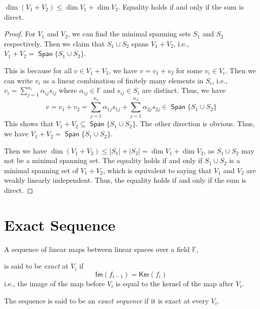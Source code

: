 \documentclass[
	11pt, %
	fleqn, %
	a4paper, %
]{LegrandOrangeBook}
\renewcommand{\ker}[1]{\mathsf{Ker}(#1)} %
\renewcommand{\Im}[1]{\mathsf{Im}(#1)} %
\newcommand{\F}{\mathbb{F}} %
\DeclareMathOperator{\Span}{\mathsf{Span}}
\begin{document}
\begin{proposition} \label{prop:dimension_of_sum_of_subspaces}
    $\dim{(V_1 + V_2)} \leq \dim{V_1} + \dim{V_2}$. Equality holds if and only if the sum is direct.
\end{proposition}

\begin{proof}
    For $V_1$ and $V_2$, we can find the minimal spanning sets $S_1$ and $S_2$ respectively. Then we claim that $S_1 \cup S_2$ spans $V_1 + V_2$, i.e., $V_1 + V_2 = \Span\{S_1 \cup S_2\}$. 
    
    This is because for all $v \in V_1 + V_2$, we have $v = v_1 + v_2$ for some $v_i \in V_i$. Then we can write $v_i$ as a linear combination of finitely many elements in $S_i$, i.e., $v_i = \sum_{j=1}^{n_i} \alpha_{ij} s_{ij}$ where $\alpha_{ij} \in \F$ and $s_{ij} \in S_i$ are distinct. Thus, we have 
    \[
        v = v_1 + v_2 = \sum_{j=1}^{n_1} \alpha_{1j} s_{1j} + \sum_{j=1}^{n_2} \alpha_{2j} s_{2j} \in \Span\{S_1 \cup S_2\}
    \]
    This shows that $V_1 + V_2 \subseteq \Span\{S_1 \cup S_2\}$. The other direction is obvious. Thus, we have $V_1 + V_2 = \Span\{S_1 \cup S_2\}$.

    Then we have $\dim{(V_1 + V_2)} \leq |S_1| + |S_2| = \dim{V_1} + \dim{V_2}$, as $S_1 \cup S_2$ may not be a minimal spanning set. The equality holds if and only if $S_1 \cup S_2$ is a minimal spanning set of $V_1 + V_2$, which is equivalent to saying that $V_1$ and $V_2$ are weakly linearly independent. Thus, the equality holds if and only if the sum is direct.
\end{proof}

\newpage

\section{Exact Sequence}

\begin{definition}
    A sequence of linear maps between linear spaces over a field $\F$,
    \begin{center}
    \end{center}
    is said to be \emph{exact} at $V_i$ if 
    \[ \Im{f_{i-1}} = \ker{f_i} \]
    i.e., the image of the map before $V_i$ is equal to the kernel of the map after $V_i$.

    The sequence is said to be an \emph{exact sequence} if it is exact at every $V_i$.
\end{definition}
\end{document}
